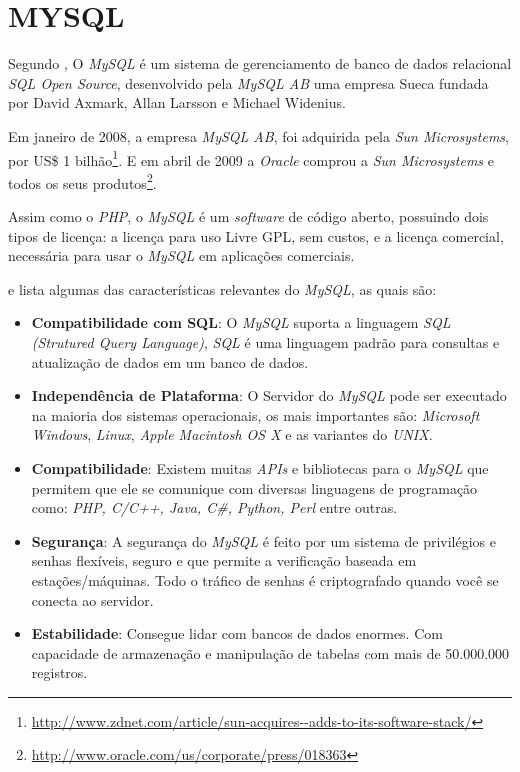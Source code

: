 \section{MYSQL}
\label{sec:mysql}

Segundo , O \textit{MySQL} é um sistema de gerenciamento de banco de dados relacional \textit{SQL Open Source}, desenvolvido pela \textit{MySQL AB} uma empresa Sueca fundada por David Axmark, Allan Larsson e Michael Widenius.

Em janeiro de 2008, a empresa \textit{MySQL AB}, foi adquirida pela \textit{Sun Microsystems}, por US\$ 1 bilhão\footnote{\url{http://www.zdnet.com/article/sun-acquires--adds-to-its-software-stack/}}. E em abril de 2009 a \textit{Oracle} comprou a \textit{Sun Microsystems} e todos os seus produtos\footnote{\url{http://www.oracle.com/us/corporate/press/018363}}.

Assim como o \textit{PHP}, o \textit{MySQL} é um \textit{software} de código aberto, possuindo dois tipos de licença: a licença para uso Livre \ac{GPL}, sem custos, e a licença comercial, necessária para usar o \textit{MySQL} em aplicações comerciais.

 e  lista algumas das características relevantes do \textit{MySQL}, as quais são:
\begin{itemize}
    \item \textbf{Compatibilidade com SQL}: O \textit{MySQL} suporta a linguagem \textit{SQL (Strutured Query Language)}, \textit{SQL} é uma linguagem padrão para consultas e atualização de dados em um banco de dados.
    \item \textbf{Independência de Plataforma}: O Servidor do \textit{MySQL} pode ser executado na maioria dos sistemas operacionais, os mais importantes são: \textit{Microsoft Windows}, \textit{Linux}, \textit{Apple Macintosh OS X} e as variantes do \textit{UNIX}.
    \item \textbf{Compatibilidade}: Existem muitas \textit{APIs} e bibliotecas para o \textit{MySQL} que permitem que ele se comunique com diversas linguagens de programação como: \textit{PHP, C/C++, Java, C\#, Python, Perl} entre outras.
    \item \textbf{Segurança}: A segurança do \textit{MySQL} é feito por um sistema de privilégios e senhas flexíveis, seguro e que permite a verificação baseada em estações/máquinas. Todo o tráfico de senhas é criptografado quando você se conecta ao servidor.
    \item \textbf{Estabilidade}: Consegue lidar com bancos de dados enormes. Com capacidade de armazenação e manipulação de tabelas com mais de 50.000.000 registros.
\end{itemize}



